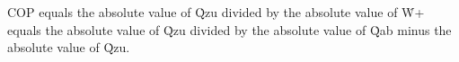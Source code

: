 COP equals the absolute value of Q̇zu divided by the absolute value of Ẇ+ equals the absolute value of Q̇zu divided by the absolute value of Q̇ab minus the absolute value of Q̇zu.